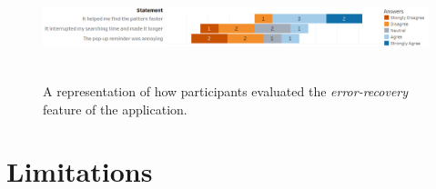 \begin{figure}[t!]
\centering
\includegraphics[width=15cm, height=3cm]{Chapters/graphics/ErrorRecovery.png}
\caption{A representation of how participants evaluated the \textit{error-recovery} feature of the application.}
\label{fig:error}
\end{figure}

\section{Limitations}


